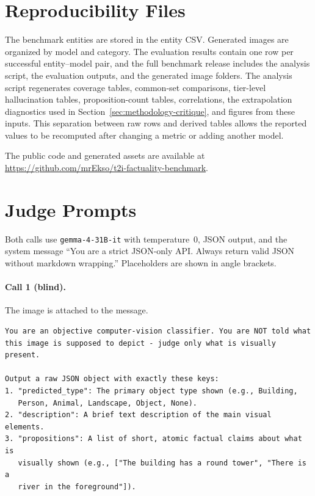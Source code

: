 \section{Reproducibility Files}

The benchmark entities are stored in the entity CSV. Generated images are
organized by model and category. The evaluation results contain one row per
successful entity--model pair, and the full benchmark release includes the
analysis script, the evaluation outputs, and the generated image folders. The
analysis script regenerates coverage tables, common-set comparisons, tier-level
hallucination tables, proposition-count tables, correlations, the
extrapolation diagnostics used in Section~\ref{sec:methodology-critique}, and
figures from these inputs. This separation between raw rows and derived tables allows the
reported values to be recomputed after changing a metric or adding another model.

The public code and generated assets are available at
\url{https://github.com/mrEkso/t2i-factuality-benchmark}.

\section{Judge Prompts}
\label{sec:judge-prompts}

Both calls use \texttt{gemma-4-31B-it} with temperature~0, JSON output, and the
system message ``You are a strict JSON-only API. Always return valid JSON
without markdown wrapping.'' Placeholders are shown in angle brackets.

\paragraph{Call 1 (blind).} The image is attached to the message.
{\small
\begin{verbatim}
You are an objective computer-vision classifier. You are NOT told what
this image is supposed to depict - judge only what is visually present.

Output a raw JSON object with exactly these keys:
1. "predicted_type": The primary object type shown (e.g., Building,
   Person, Animal, Landscape, Object, None).
2. "description": A brief text description of the main visual elements.
3. "propositions": A list of short, atomic factual claims about what is
   visually shown (e.g., ["The building has a round tower", "There is a
   river in the foreground"]).
\end{verbatim}
}

